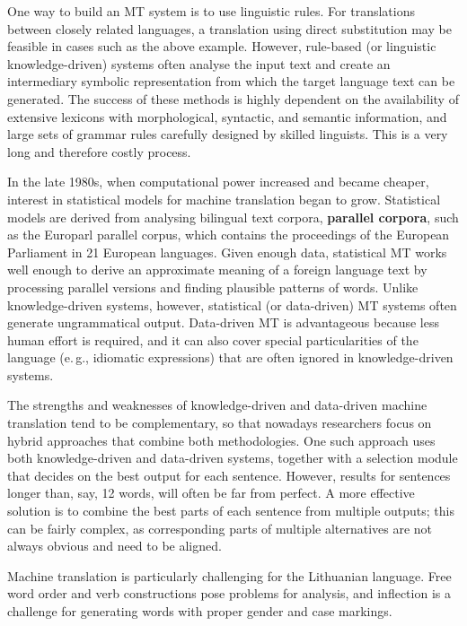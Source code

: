 \begin{multicols}{2}
One way to build an MT system is to use linguistic rules. For translations between closely related languages, a translation using direct substitution may be feasible in cases such as the above example. However, rule-based (or linguistic knowledge-driven) systems often analyse the input text and create an intermediary symbolic representation from which the target language text can be generated. The success of these methods is highly dependent on the availability of extensive lexicons with morphological, syntactic, and semantic information, and large sets of grammar rules carefully designed by skilled linguists. This is a very long and therefore costly process.

In the late 1980s, when computational power increased and became cheaper, interest in statistical models for machine translation began to grow. Statistical models are derived from analysing bilingual text corpora, \textbf{parallel corpora}, such as the Europarl parallel corpus, which contains the proceedings of the European Parliament in 21 European languages. Given enough data, statistical MT works well enough to derive an approximate meaning of a foreign language text by processing parallel versions and finding plausible patterns of words. Unlike knowledge-driven systems, however, statistical (or data-driven) MT systems often generate ungrammatical output. Data-driven MT is advantageous because less human effort is required, and it can also cover special particularities of the language (e.\,g., idiomatic expressions) that are often ignored in knowledge-driven systems. 

The strengths and weaknesses of knowledge-driven and data-driven machine translation tend to be complementary, so that nowadays researchers focus on hybrid approaches that combine both methodologies. One such approach uses both knowledge-driven and data-driven systems, together with a selection module that decides on the best output for each sentence. However, results for sentences longer than, say, 12 words, will often be far from perfect. A more effective solution is to combine the best parts of each sentence from multiple outputs; this can be fairly complex, as corresponding parts of multiple alternatives are not always obvious and need to be aligned. 


Machine translation is particularly challenging for the Lithuanian language. Free word order and verb constructions pose problems for analysis, and inflection is a challenge for generating words with proper gender and case markings. 


\end{multicols}
